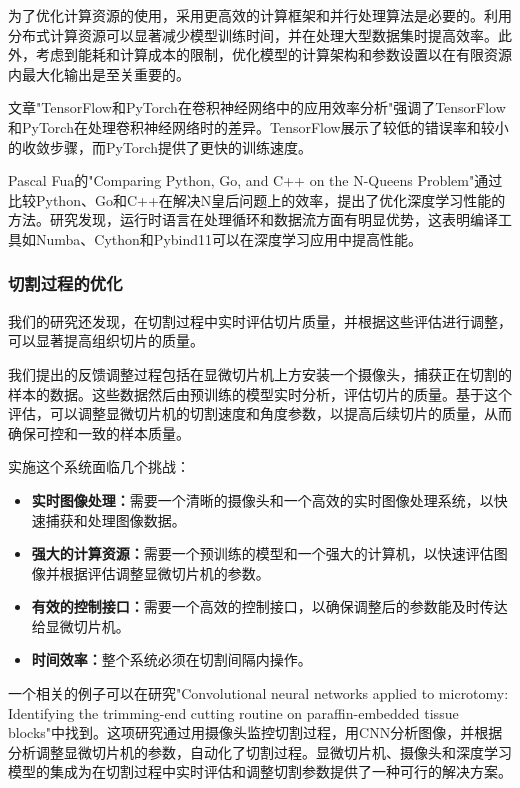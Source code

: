 为了优化计算资源的使用，采用更高效的计算框架和并行处理算法是必要的。利用分布式计算资源可以显著减少模型训练时间，并在处理大型数据集时提高效率。此外，考虑到能耗和计算成本的限制，优化模型的计算架构和参数设置以在有限资源内最大化输出是至关重要的。

文章"TensorFlow和PyTorch在卷积神经网络中的应用效率分析"强调了TensorFlow和PyTorch在处理卷积神经网络时的差异\cite{6.2}。TensorFlow展示了较低的错误率和较小的收敛步骤，而PyTorch提供了更快的训练速度。

Pascal Fua的"Comparing Python, Go, and C++ on the N-Queens Problem"通过比较Python、Go和C++在解决N皇后问题上的效率，提出了优化深度学习性能的方法。\cite{6.3}研究发现，运行时语言在处理循环和数据流方面有明显优势，这表明编译工具如Numba、Cython和Pybind11可以在深度学习应用中提高性能。

\subsubsection{切割过程的优化}

我们的研究还发现，在切割过程中实时评估切片质量，并根据这些评估进行调整，可以显著提高组织切片的质量。

我们提出的反馈调整过程包括在显微切片机上方安装一个摄像头，捕获正在切割的样本的数据。这些数据然后由预训练的模型实时分析，评估切片的质量。基于这个评估，可以调整显微切片机的切割速度和角度参数，以提高后续切片的质量，从而确保可控和一致的样本质量。

实施这个系统面临几个挑战：

\begin{itemize} \item \textbf{实时图像处理：}需要一个清晰的摄像头和一个高效的实时图像处理系统，以快速捕获和处理图像数据。 \item \textbf{强大的计算资源：}需要一个预训练的模型和一个强大的计算机，以快速评估图像并根据评估调整显微切片机的参数。 \item \textbf{有效的控制接口：}需要一个高效的控制接口，以确保调整后的参数能及时传达给显微切片机。 \item \textbf{时间效率：}整个系统必须在切割间隔内操作。 \end{itemize}

一个相关的例子可以在研究"Convolutional neural networks applied to microtomy: Identifying the trimming-end cutting routine on paraffin-embedded tissue blocks"\cite{6.4}中找到。这项研究通过用摄像头监控切割过程，用CNN分析图像，并根据分析调整显微切片机的参数，自动化了切割过程。显微切片机、摄像头和深度学习模型的集成为在切割过程中实时评估和调整切割参数提供了一种可行的解决方案。

